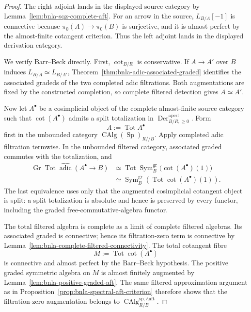 \begin{proof}
The right adjoint lands in the displayed source category by
Lemma~\ref{lem:bnla-sqz-complete-aft}.  For an arrow in the source,
$L_{B/A}[-1]$ is connective because $\pi_0(A)\to\pi_0(B)$ is surjective, and
it is almost perfect by the almost-finite cotangent criterion.  Thus the left
adjoint lands in the displayed derivation category.

We verify Barr--Beck directly.  First, $\operatorname{cot}_{B/R}$ is
conservative.  If $A\to A'$ over $B$ induces
$L_{B/A}\simeq L_{B/A'}$, Theorem~\ref{thm:bnla-adic-associated-graded}
identifies the associated gradeds of the two completed adic filtrations.
Both augmentations are fixed by the constructed completion, so complete
filtered detection gives $A\simeq A'$.

Now let $A^\bullet$ be a cosimplicial object of the complete almost-finite
source category such that
$\operatorname{cot}(A^\bullet)$ admits a split totalization in
$\operatorname{Der}^{\mathrm{aperf}}_{B/R,\geq0}$.  Form
\[
    A:=\operatorname*{Tot}A^\bullet
\]
first in the unbounded category
$\operatorname{CAlg}(\operatorname{Sp})_{R//B}$.
Apply completed adic filtration termwise.  In the unbounded filtered category,
associated graded commutes with the totalization, and
\[
\begin{aligned}
\operatorname{Gr}
\operatorname*{Tot}
\widehat{\operatorname{adic}}(A^\bullet\to B)
&\simeq
\operatorname*{Tot}
\operatorname{Sym}^{\mathrm{gr}}_B
\bigl(\operatorname{cot}(A^\bullet)(1)\bigr)
\\
&\simeq
\operatorname{Sym}^{\mathrm{gr}}_B
\left(
\operatorname*{Tot}\operatorname{cot}(A^\bullet)(1)
\right).
\end{aligned}
\]
The last equivalence uses only that the augmented cosimplicial cotangent
object is split: a split totalization is absolute and hence is preserved by
every functor, including the graded free-commutative-algebra functor.

The total filtered algebra is complete as a limit of complete filtered
algebras.  Its associated graded is connective; hence its filtration-zero
term is connective by
Lemma~\ref{lem:bnla-complete-filtered-connectivity}.  The total cotangent
fibre
\[
    M:=\operatorname*{Tot}\operatorname{cot}(A^\bullet)
\]
is connective and almost perfect by the Barr--Beck hypothesis.  The positive
graded symmetric algebra on $M$ is almost finitely augmented by
Lemma~\ref{lem:bnla-positive-graded-aft}.  The same filtered approximation
argument as in Proposition~\ref{prop:bnla-spectral-aft-criterion} therefore
shows that the filtration-zero augmentation belongs to
$\operatorname{CAlg}^{\mathrm{sp},\wedge\mathrm{aft}}_{R/B}$.


\end{proof}
